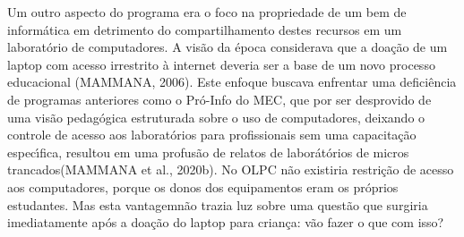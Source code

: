\documentclass[
12pt,		%
openright,	%
twoside,  %
a4paper,			%
chapter=TITLE,		%
english,			%
french,				%
spanish,			%
brazil				%
]{USPSC-classe/USPSC}
\begin{document}
\noindent\begin{center}\mbox{\centering{}}\end{center}


Um outro aspecto do programa era o foco na \textquotedbl propriedade de um bem de inform\'atica em detrimento do compartilhamento destes recursos em um laborat\'orio de computadores\textquotedbl . A vis\~ao da \'epoca considerava que a doa\c{c}\~ao de um laptop com acesso irrestrito \`a internet deveria ser a base de um novo processo educacional  (MAMMANA, 2006). Este enfoque buscava enfrentar uma defici\^encia de programas anteriores como o Pr\'o-Info do MEC, que por ser desprovido de uma vis\~ao pedag\'ogica estruturada sobre o uso de computadores, deixando o controle de acesso aos laborat\'orios para profissionais sem uma capacita\c{c}\~ao espec\'{\i}fica, resultou em uma profus\~ao de relatos de \textquotedbl labor\'at\'orios de micros trancados\textquotedbl   (MAMMANA et al., 2020b). No OLPC n\~ao existiria restri\c{c}\~ao de acesso aos computadores, porque os donos dos equipamentos eram os pr\'oprios estudantes. Mas esta \textquotedbl vantagem\textquotedbl  n\~ao trazia luz sobre  uma quest\~ao que surgiria imediatamente ap\'os a doa\c{c}\~ao do laptop para crian\c{c}a: v\~ao fazer o que com isso?
\end{document}
